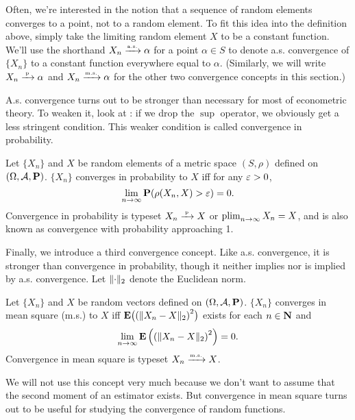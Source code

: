 \documentclass[11pt,letterpaper,reqno,oneside]{article}
\begin{document}
\begin{remark}
	Often, we're interested in the notion that a sequence of random elements converges to a point, not to a random element. To fit this idea into the definition above, simply take the limiting random element $X$ to be a constant function. We'll use the shorthand $X_n \xrightarrow{{\scriptscriptstyle \mathrm{a.s.}}} \alpha$ for a point $\alpha \in S$ to denote a.s. convergence of $\{X_n\}$ to a constant function everywhere equal to $\alpha$. (Similarly, we will write $X_n \xrightarrow{{\scriptscriptstyle \mathrm{\;p\;}}} \alpha$ and $X_n \xrightarrow{{\scriptscriptstyle \mathrm{m.s.}}} \alpha$ for the other two convergence concepts in this section.)
\end{remark}


A.s. convergence turns out to be stronger than necessary for most of econometric theory. To weaken it, look at : if we drop the $\sup$ operator, we obviously get a less stringent condition. This weaker condition is called convergence in probability.
%
\begin{definition}
	Let $\{ X_n \}$ and $X$ be random elements of a metric space $(S,\rho)$ defined on $(\Omega,\mathcal{A},\mathbf{P})$. $\{ X_n \}$ converges in probability to $X$ iff for any $\varepsilon>0$,
	\begin{equation*}
		\lim_{n\to\infty} \mathbf{P}( \rho(X_n,X) > \varepsilon ) = 0 .
	\end{equation*}
	Convergence in probability is typeset $X_n \xrightarrow{{\scriptscriptstyle \mathrm{\;p\;}}} X$ or $\operatorname*{plim}_{n\to\infty} X_n = X$, and is also known as convergence with probability approaching 1.
\end{definition}


Finally, we introduce a third convergence concept. Like a.s. convergence, it is stronger than convergence in probability, though it neither implies nor is implied by a.s. convergence. Let $\lVert\cdot\rVert_2$ denote the Euclidean norm.
%
\begin{definition}
	Let $\{ X_n \}$ and $X$ be random vectors defined on $(\Omega,\mathcal{A},\mathbf{P})$. $\{ X_n \}$ converges in mean square (m.s.) to $X$ iff $\mathbf{E}\bigl( \left(\lVert X_n-X\rVert_2\right)^2 \bigr)$ exists for each $n \in \mathbf{N}$ and
	\begin{equation*}
		\lim_{n\to\infty} \mathbf{E}\left( \left(\lVert X_n-X\rVert_2\right)^2 \right) = 0 .
	\end{equation*}
	Convergence in mean square is typeset $X_n \xrightarrow{{\scriptscriptstyle \mathrm{m.s.}}} X$.
\end{definition}
%
We will not use this concept very much because we don't want to assume that the second moment of an estimator exists. But convergence in mean square turns out to be useful for studying the convergence of random functions.
\end{document}
